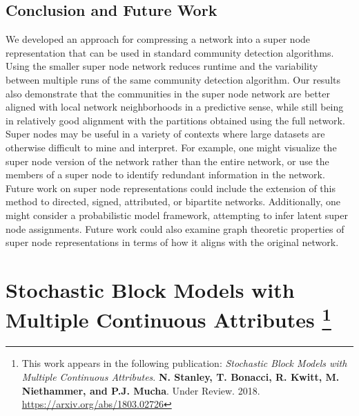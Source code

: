 \section{Conclusion and Future Work}
\indent We developed an approach for compressing a network into a super node representation that can be used in standard community detection algorithms. Using the smaller super node network reduces runtime and the variability between multiple runs of the same community detection algorithm. Our results also demonstrate that the communities in the super node network are better aligned with local network neighborhoods in a predictive sense, while still being in relatively good alignment with the partitions obtained using the full network. \\
\indent Super nodes may be useful in a variety of contexts where large datasets are otherwise difficult to mine and interpret. For example, one might visualize the super node version of the network rather than the entire network, or use the members of a super node to identify redundant information in the network. Future work on super node representations could include the extension of this method to directed, signed, attributed, or bipartite networks. Additionally, one might consider a probabilistic model framework, attempting to infer latent super node assignments. 
Future work could also examine graph theoretic properties of super node representations in terms of how it aligns with the original network. 



\chapter[Stochastic Block Models with Multiple Continuous Attributes]{Stochastic Block Models with Multiple Continuous Attributes \footnote{
     This work appears in the following publication:
       \emph{Stochastic Block Models with Multiple Continuous Attributes}. {\bf N. Stanley, T. Bonacci, R. Kwitt, M. Niethammer, and P.J. Mucha}. Under Review. 2018. \url{https://arxiv.org/abs/1803.02726}
}
}

